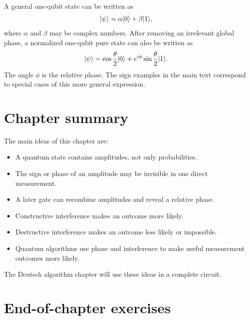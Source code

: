 \begin{goingdeeper}
A general one-qubit state can be written as
\begin{equation}
\lvert \psi\rangle=\alpha\lvert 0\rangle+\beta\lvert 1\rangle,
\end{equation}
where $\alpha$ and $\beta$ may be complex numbers. After removing an irrelevant global phase, a normalized one-qubit pure state can also be written as
\begin{equation}
\lvert \psi\rangle
=
\cos\frac{\theta}{2}\lvert 0\rangle
+
e^{i\phi}\sin\frac{\theta}{2}\lvert 1\rangle.
\end{equation}
The angle $\phi$ is the relative phase. The sign examples in the main text correspond to special cases of this more general expression.
\end{goingdeeper}

\section{Chapter summary}
\label{sec:ch06-summary}

The main ideas of this chapter are:
\begin{itemize}
  \item A quantum state contains amplitudes, not only probabilities.
  \item The sign or phase of an amplitude may be invisible in one direct measurement.
  \item A later gate can recombine amplitudes and reveal a relative phase.
  \item Constructive interference makes an outcome more likely.
  \item Destructive interference makes an outcome less likely or impossible.
  \item Quantum algorithms use phase and interference to make useful measurement outcomes more likely.
\end{itemize}

The Deutsch algorithm chapter will use these ideas in a complete circuit.

\section{End-of-chapter exercises}
\label{sec:ch06-end-exercises}

